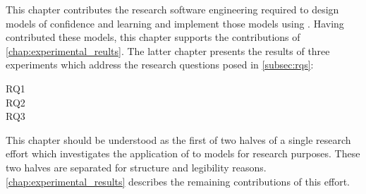 This chapter contributes the research software engineering required to design
\aspectoriented models of confidence and learning and implement those models
using \pdsfthree{}.  Having contributed these \aspectoriented models, this
chapter supports the contributions of \cref{chap:experimental_reults}. The
latter chapter presents the results of three experiments which address the
research questions posed in \cref{subsec:rqs}:

\begin{researchquestion}
  \begin{description}
\item[RQ1] \rqone{}
\item[RQ2] \rqtwo{}
\item[RQ3] \rqthree{}
  \end{description}
\end{researchquestion}

This chapter should be understood as the first of two halves of a single
research effort which investigates the application of \aop to models for
research purposes. These two halves are separated for structure and legibility
reasons. \cref{chap:experimental_results} describes the remaining contributions
of this effort.




